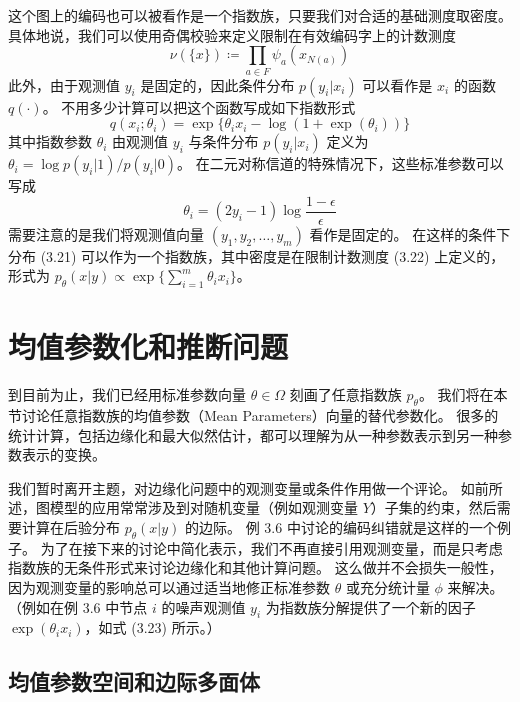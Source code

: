 \begin{tcolorbox}
\begin{exam}[带有硬约束的模型]
这个图上的编码也可以被看作是一个指数族，只要我们对合适的基础测度取密度。
具体地说，我们可以使用奇偶校验来定义限制在有效编码字上的计数测度
\begin{equation}
    \nu(\{x\}) \coloneqq \prod_{a \in F}\psi_a(x_{N(a)})
\end{equation}
此外，由于观测值 $y_i$ 是固定的，因此条件分布 $p(y_i|x_i)$ 可以看作是 $x_i$ 的函数 $q(\cdot)$。
不用多少计算可以把这个函数写成如下指数形式
\begin{equation}
    q(x_i; \theta_i) = \exp\{\theta_ix_i - \log(1+\exp(\theta_i))\}
\end{equation}
其中指数参数 $\theta_i$ 由观测值 $y_i$ 与条件分布 $p(y_i|x_i)$ 定义为 $\theta_i = \log p(y_i|1)/p(y_i|0)$。
在二元对称信道的特殊情况下，这些标准参数可以写成
\begin{equation}
    \theta_i = (2y_i - 1)\log \frac{1-\epsilon}{\epsilon}
\end{equation}
需要注意的是我们将观测值向量 $(y_1, y_2, \dots, y_m)$ 看作是固定的。
在这样的条件下分布 (3.21) 可以作为一个指数族，其中密度是在限制计数测度 (3.22) 上定义的，形式为 $p_{\theta}(x|y) \propto \exp\{\sum_{i = 1}^m\theta_ix_i\}$。

\end{exam}
\end{tcolorbox}

\section{均值参数化和推断问题}

到目前为止，我们已经用标准参数向量 $\theta \in \Omega$ 刻画了任意指数族 $p_{\theta}$。
我们将在本节讨论任意指数族的均值参数（Mean Parameters）向量的替代参数化。
很多的统计计算，包括边缘化和最大似然估计，都可以理解为从一种参数表示到另一种参数表示的变换。

我们暂时离开主题，对边缘化问题中的观测变量或条件作用做一个评论。
如前所述，图模型的应用常常涉及到对随机变量（例如观测变量 $Y$）子集的约束，然后需要计算在后验分布 $p_{\theta}(x|y)$ 的边际。
例 3.6 中讨论的编码纠错就是这样的一个例子。
为了在接下来的讨论中简化表示，我们不再直接引用观测变量，而是只考虑指数族的无条件形式来讨论边缘化和其他计算问题。
这么做并不会损失一般性，因为观测变量的影响总可以通过适当地修正标准参数 $\theta$ 或充分统计量 $\phi$ 来解决。
（例如在例 3.6 中节点 $i$ 的噪声观测值 $y_i$ 为指数族分解提供了一个新的因子 $\exp(\theta_ix_i)$，如式 (3.23) 所示。）

\subsection{均值参数空间和边际多面体}

